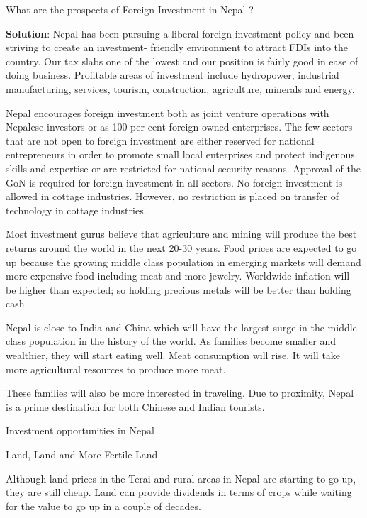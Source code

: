 \documentclass[
  openany]{book}
\newcommand{\question}{\item}
\newenvironment{solution}{ {\bfseries Solution}:}{}
\begin{document}
\begin{questions}

\question What are the prospects of Foreign Investment in Nepal ?

\begin{solution}
Nepal has been pursuing a liberal foreign investment policy and been striving to create an investment- friendly environment to attract FDIs into the country. Our tax slabs one of the lowest and our position is fairly good in ease of doing business. Profitable areas of investment include hydropower, industrial manufacturing, services, tourism, construction, agriculture, minerals and energy.

Nepal encourages foreign investment both as joint venture operations with Nepalese investors or as 100 per cent foreign-owned enterprises. The few sectors that are not open to foreign investment are either reserved for national entrepreneurs in order to promote small local enterprises and protect indigenous skills and expertise or are restricted for national security reasons. Approval of the GoN is required for foreign investment in all sectors. No foreign investment is allowed in cottage industries. However, no restriction is placed on transfer of technology in cottage industries.

Most investment gurus believe that agriculture and mining will produce the best returns around the world in the next 20-30 years. Food prices are expected to go up because the growing middle class population in emerging markets will demand more expensive food including meat and more jewelry. Worldwide inflation will be higher than expected; so holding precious metals will be better than holding cash.

Nepal is close to India and China which will have the largest surge in the middle class population in the history of the world. As families become smaller and wealthier, they will start eating well. Meat consumption will rise. It will take more agricultural resources to produce more meat.

These families will also be more interested in traveling. Due to proximity, Nepal is a prime destination for both Chinese and Indian tourists.

Investment opportunities in Nepal

Land, Land and More Fertile Land

Although land prices in the Terai and rural areas in Nepal are starting to go up, they are still cheap. Land can provide dividends in terms of crops while waiting for the value to go up in a couple of decades.


\end{solution}
\end{questions}
\end{document}
